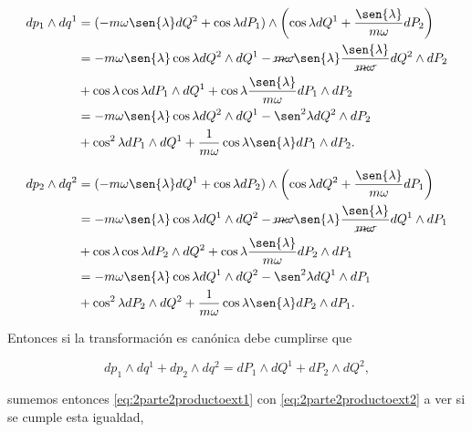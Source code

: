\documentclass[a4paper,10pt]{article}
\numberwithin{equation}{section}
\begin{document}
\begin{align}
\begin{split}
 dp_1 \wedge dq^1 &= (- m\omega\sen{\lambda} dQ^2 + \cos{\lambda}dP_1) \wedge 
  \left(\cos{\lambda}dQ^1 + \frac{\sen{\lambda}}{m\omega}dP_2\right) \\
  &= - m\omega\sen{\lambda}\cos{\lambda} dQ^2 \wedge dQ^1  
  - \cancel{m\omega}\sen{\lambda}\frac{\sen{\lambda}}{\cancel{m\omega}}dQ^2 \wedge dP_2 \\
  &+ \cos{\lambda}\cos{\lambda}dP_1 \wedge dQ^1 + 
  \cos{\lambda}\frac{\sen{\lambda}}{m\omega} dP_1 \wedge dP_2 \\
  &= - m\omega\sen{\lambda}\cos{\lambda} dQ^2 \wedge dQ^1
  - \sen^2{\lambda}dQ^2 \wedge dP_2 \\ 
  &+ \cos^2{\lambda}dP_1 \wedge dQ^1 + \frac{1}{m\omega}\cos{\lambda}\sen{\lambda} dP_1 \wedge dP_2.
  \label{eq:2parte2productoext1}
\end{split}
\end{align}

\begin{align}
\begin{split}
 dp_2 \wedge dq^2 &= (- m\omega\sen{\lambda} dQ^1 + \cos{\lambda}dP_2) \wedge 
 \left(\cos{\lambda}dQ^2 + \frac{\sen{\lambda}}{m\omega}dP_1\right) \\
 &= - m\omega\sen{\lambda}\cos{\lambda} dQ^1 \wedge dQ^2  
  - \cancel{m\omega}\sen{\lambda}\frac{\sen{\lambda}}{\cancel{m\omega}}dQ^1 \wedge dP_1 \\
  &+ \cos{\lambda}\cos{\lambda}dP_2 \wedge dQ^2 + 
  \cos{\lambda}\frac{\sen{\lambda}}{m\omega} dP_2 \wedge dP_1 \\
  &= - m\omega\sen{\lambda}\cos{\lambda} dQ^1 \wedge dQ^2
  - \sen^2{\lambda}dQ^1 \wedge dP_1 \\ 
  &+ \cos^2{\lambda}dP_2 \wedge dQ^2 + \frac{1}{m\omega}\cos{\lambda}\sen{\lambda} dP_2 \wedge dP_1.
  \label{eq:2parte2productoext2}
\end{split}
\end{align}

Entonces si la transformación es canónica debe cumplirse que 

\begin{equation}
 dp_1 \wedge dq^1 + dp_2 \wedge dq^2 = dP_1 \wedge dQ^1 + dP_2 \wedge dQ^2,
\end{equation}

sumemos entonces \eqref{eq:2parte2productoext1} con \eqref{eq:2parte2productoext2} a ver 
si se cumple esta igualdad,
\end{document}
